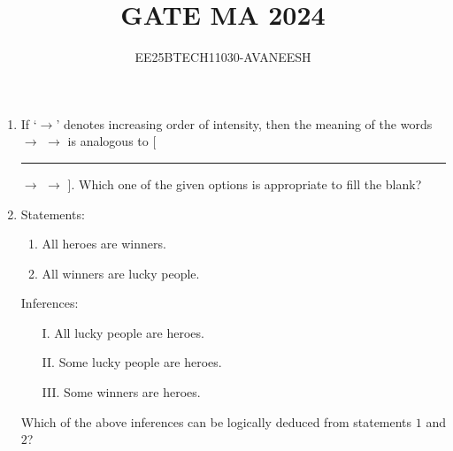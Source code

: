 \documentclass[journal,12pt,onecolumn]{IEEEtran}
\title{GATE MA 2024}
\author{EE25BTECH11030-AVANEESH}
\theoremstyle{remark}
\begin{document}
\maketitle
\begin{enumerate}

\item If `$\rightarrow$' denotes increasing order of intensity, then the meaning of the words  $\rightarrow$  $\rightarrow$  is analogous to [\rule{3cm}{0.15mm} $\rightarrow$  $\rightarrow$ ]. Which one of the given options is appropriate to fill the blank? \hfill{}
\begin{enumerate}
\end{enumerate}

\item Statements:
\begin{enumerate}
    \item All heroes are winners.
    \item All winners are lucky people.
\end{enumerate}
Inferences:
\begin{enumerate}
    \item[I.] All lucky people are heroes.
    \item[II.] Some lucky people are heroes.
    \item[III.] Some winners are heroes.
\end{enumerate}
Which of the above inferences can be logically deduced from statements $1$ and $2$? \hfill{}
\begin{enumerate}
\end{enumerate}


\end{enumerate}
\end{document}
